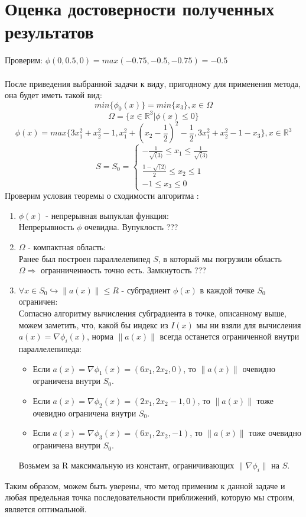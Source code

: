 \documentclass[main.tex]{subfiles}
\begin{document}
\section{Оценка достоверности полученных результатов}
Проверим: $\phi(0, 0.5, 0) = max(-0.75, -0.5, -0.75) = -0.5$\\ \\
После приведения выбранной задачи к виду, пригодному для применения метода, она будет иметь такой вид: 
$$min\{\phi_0(x)\} = min\{x_3\}, x \in \Omega$$
$$\Omega = \{x \in \mathds{R}^3 | \phi(x) \leq 0\}$$
$$\phi(x) = max\{3x_1^2 + x_2^2 - 1, x_1^2 + (x_2 -\frac{1}{2})^2 - \frac{1}{2}, 3x_1^2 + x_2^2 - 1 - x_3\}, x \in \mathds{R}^3$$
\begin{equation*}
S = S_0 = 
\begin{cases}
-\frac{1}{\sqrt(3)} \leq x_1 \leq \frac{1}{\sqrt(3)}\\
\frac{1-\sqrt(2)}{2} \leq x_2 \leq 1\\
-1 \leq x_3 \leq 0
\end{cases}
\end{equation*}
Проверим условия теоремы о сходимости алгоритма \cite{petuh}:
\begin{enumerate}
	\item $\phi(x)$ - непрерывная выпуклая функция:\\
	Непрерывность $\phi$ очевидна.
	Вупуклость ???
	\item $\Omega$ - компактная область:\\
	Ранее был построен параллелепипед $S$, в который мы погрузили область $\Omega \Longrightarrow$ огранниченность точно есть.
	Замкнутость ???
	\item $\forall x \in S_0 \hookrightarrow \|a(x)\| \leq R$ - субградиент $\phi(x)$ в каждой точке $S_0$ ограничен:\\
	Согласно алгоритму вычисления субградиента в точке, описанному выше, можем заметить, что, какой бы индекс из $I(x)$ мы ни взяли для вычисления $a(x) = \nabla \phi_i(x)$, норма $\|a(x)\|$ всегда останется ограниченной внутри параллелепипеда:
	\begin{itemize}
		\item Если $a(x) = \nabla\phi_1(x) = (6x_1, 2x_2, 0)$, то $\|a(x)\|$ очевидно ограничена внутри $S_0$.
		\item Если $a(x) = \nabla\phi_2(x) = (2x_1, 2x_2 - 1, 0)$, то $\|a(x)\|$ тоже очевидно ограничена внутри $S_0$.
		\item Если $a(x) = \nabla\phi_3(x) = (6x_1, 2x_2, -1)$, то $\|a(x)\|$ тоже очевидно ограничена внутри $S_0$.
	\end{itemize}
	Возьмем за R максимальную из констант, ограничивающих $\|\nabla\phi_i\|$ на $S$.
\end{enumerate}
Таким образом, можем быть уверены, что метод применим к данной задаче и любая предельная точка последовательности приближений, которую мы строим, является оптимальной.
\end{document}
